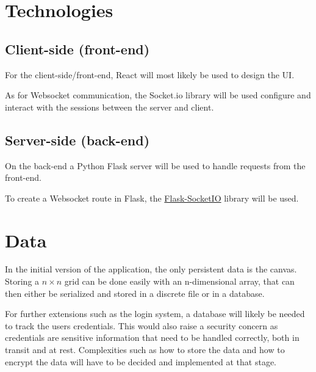 \clearpage

\section{Technologies}\label{sec:technologies}

\subsection{Client-side (front-end)}\label{subsec:client-side-(front-end)}

For the client-side/front-end, React will most likely be used to design the UI.

As for Websocket communication, the Socket.io library will be used configure and interact with the sessions between the server and client.

\subsection{Server-side (back-end)}\label{subsec:server-side-(back-end)}

On the back-end a Python Flask server will be used to handle requests from the front-end.

To create a Websocket route in Flask, the \href{https://flask-socketio.readthedocs.io/}{Flask-SocketIO} library will be used.

\section{Data}\label{sec:data}

In the initial version of the application, the only persistent data is the canvas.
Storing a $n\times n$ grid can be done easily with an n-dimensional array, that can then either be serialized and stored in a discrete file or in a database.

For further extensions such as the login system, a database will likely be needed to track the users credentials.
This would also raise a security concern as credentials are sensitive information that need to be handled correctly, both in transit and at rest.
Complexities such as how to store the data and how to encrypt the data will have to be decided and implemented at that stage.